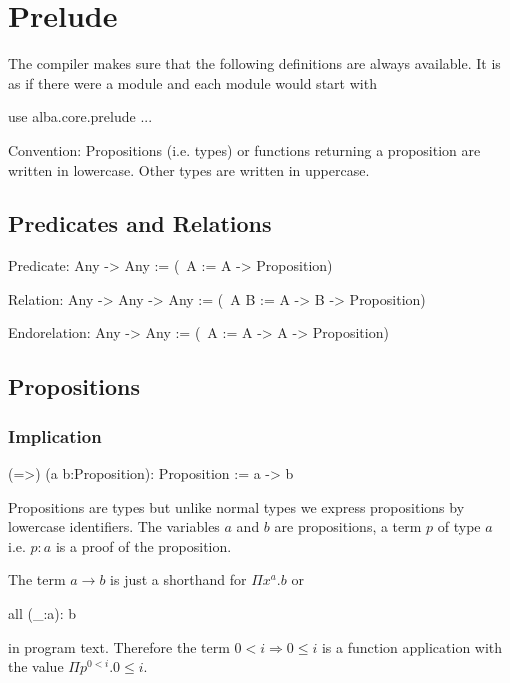 \section{Prelude}

The compiler makes sure that the following definitions are always
available. It is as if there were a module  and each
module would start with
\begin{alba}
  use
     alba.core.prelude
     ...
\end{alba}


Convention: Propositions (i.e. types) or functions returning a proposition are
written in lowercase. Other types are written in uppercase.


\subsection{Predicates and Relations}
\label{sec:predicates-and-relations}

\begin{alba}
  Predicate: Any -> Any
    := (\ A := A -> Proposition)

  Relation: Any -> Any -> Any
    := (\ A B := A -> B -> Proposition)

  Endorelation: Any -> Any
    := (\ A := A -> A -> Proposition)
\end{alba}
\vskip 2mm





\subsection{Propositions}
\label{sec:prelude-propositions}


\subsubsection{Implication}
%
\begin{alba}
  (=>) (a b:Proposition): Proposition
    := a -> b
\end{alba}

Propositions are types but unlike normal types we express propositions by
lowercase identifiers. The variables $a$ and $b$ are propositions, a term $p$
of type $a$ i.e. $p:a$ is a proof of the proposition.

The term $a\to b$ is just a shorthand for $\Pi x^a.b$ or
\begin{alba}
  all (_:a): b
\end{alba}
in program text. Therefore the term $0 < i \Rightarrow 0 \le i$ is a function
application with the value $\Pi p^{0 < i}. 0 \le i$.
\newline





